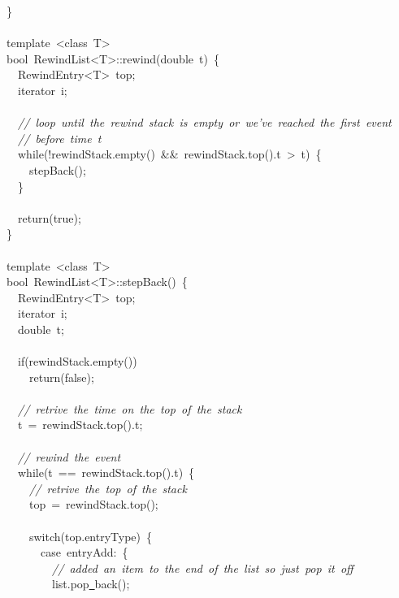 {\}\\
\ \\
template\ <{}class\ T>{}\\
bool\ RewindList<{}T>{}::rewind(double\ t)\ \{\\
\ \ RewindEntry<{}T>{}\ top;\\
\ \ iterator\ i;\\
\ \\
\ \ \textsl{//\ loop\ until\ the\ rewind\ stack\ is\ empty\ or\ we've\ reached\ the\ first\ event}\\
\ \ \textsl{//\ before\ time\ t}\\
\ \ while(!rewindStack.empty()\ \&\&\ rewindStack.top().t\ >{}\ t)\ \{\\
\ \ \ \ stepBack();\\
\ \ \}\\
\ \\
\ \ return(true);\\
\}\\
\ \\
template\ <{}class\ T>{}\\
bool\ RewindList<{}T>{}::stepBack()\ \{\\
\ \ RewindEntry<{}T>{}\ top;\\
\ \ iterator\ i;\\
\ \ double\ t;\\
\ \\
\ \ if(rewindStack.empty())\\
\ \ \ \ return(false);\\
\ \\
\ \ \textsl{//\ retrive\ the\ time\ on\ the\ top\ of\ the\ stack}\\
\ \ t\ =\ rewindStack.top().t;\\
\ \\
\ \ \textsl{//\ rewind\ the\ event}\\
\ \ while(t\ ==\ rewindStack.top().t)\ \{\\
\ \ \ \ \textsl{//\ retrive\ the\ top\ of\ the\ stack}\\
\ \ \ \ top\ =\ rewindStack.top();\\
\ \\
\ \ \ \ switch(top.entryType)\ \{\\
\ \ \ \ \ \ case\ entryAdd:\ \{\\
\ \ \ \ \ \ \ \ \textsl{//\ added\ an\ item\ to\ the\ end\ of\ the\ list\ so\ just\ pop\ it\ off}\\
\ \ \ \ \ \ \ \ list.pop\underline\ back();\\
}
